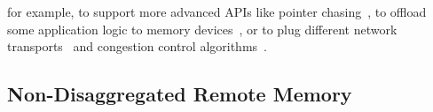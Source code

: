 for example, to support more advanced APIs like pointer chasing~\cite{StRoM,AIFM},
to offload some application logic to memory devices~\cite{AIFM,XXX},
or to plug different network transports~\cite{Homa,NDP,pFabric,XXX} and congestion control algorithms~\cite{Swift,XXX}.

\fi





\subsection{Non-Disaggregated Remote Memory}
\label{sec:remotemem}

